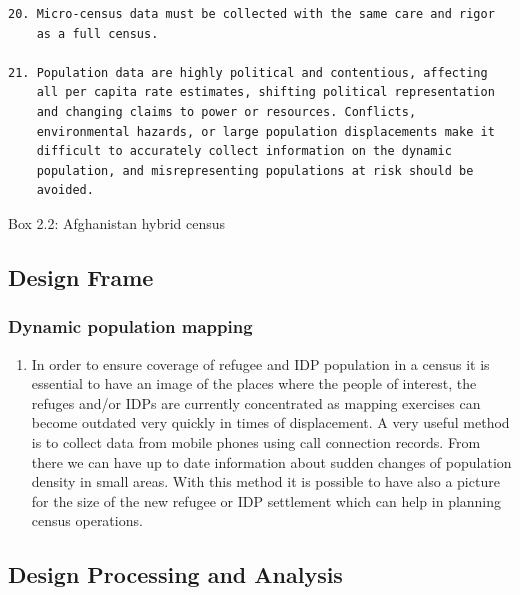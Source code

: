 \documentclass[
]{article}
\providecommand{\tightlist}{%
  \setlength{\itemsep}{0pt}\setlength{\parskip}{0pt}}
\begin{document}
\begin{verbatim}
20. Micro-census data must be collected with the same care and rigor
    as a full census.

21. Population data are highly political and contentious, affecting
    all per capita rate estimates, shifting political representation
    and changing claims to power or resources. Conflicts,
    environmental hazards, or large population displacements make it
    difficult to accurately collect information on the dynamic
    population, and misrepresenting populations at risk should be
    avoided.
\end{verbatim}

Box 2.2: Afghanistan hybrid census

\hypertarget{design-frame}{%
\subsection{Design Frame}\label{design-frame}}

\hypertarget{a.-dynamic-population-mapping}{%
\subsubsection{Dynamic population mapping}\label{a.-dynamic-population-mapping}}

\begin{enumerate}
\def\labelenumi{\arabic{enumi}.}
\setcounter{enumi}{106}
\tightlist
\item
  In order to ensure coverage of refugee and IDP population in a
  census it is essential to have an image of the places where the
  people of interest, the refuges and/or IDPs are currently
  concentrated as mapping exercises can become outdated very quickly
  in times of displacement. A very useful method is to collect data
  from mobile phones using call connection records. From there we can
  have up to date information about sudden changes of population
  density in small areas. With this method it is possible to have also
  a picture for the size of the new refugee or IDP settlement which
  can help in planning census operations.
\end{enumerate}

\hypertarget{design-processing-and-analysis}{%
\subsection{Design Processing and Analysis}\label{design-processing-and-analysis}}
\end{document}
